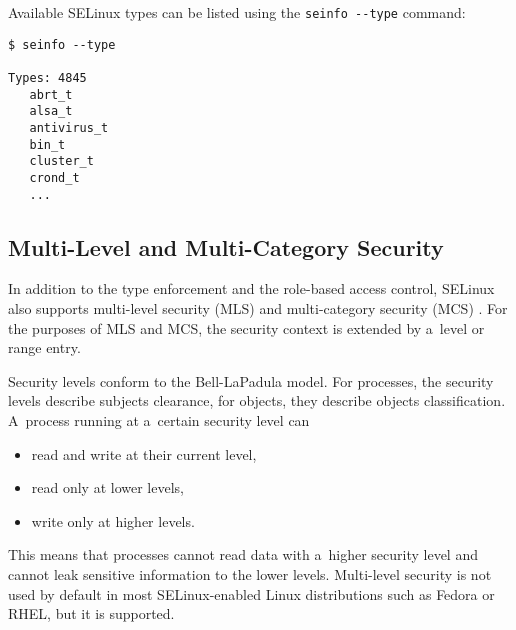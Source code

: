 \pagebreak

Available SELinux types can be listed using the \texttt{seinfo -{}-type}
command:
\begin{lstlisting}
$ seinfo --type

Types: 4845
   abrt_t
   alsa_t
   antivirus_t
   bin_t
   cluster_t
   crond_t
   ...
\end{lstlisting}

\subsection{Multi-Level and Multi-Category Security}
\label{mls}
In addition to the type enforcement and the role-based access control, SELinux
also supports multi-level security (MLS) and multi-category security (MCS)
\cite[pp.~48--53]{tsn}. For the purposes of MLS and MCS, the security context is
extended by a~level or range entry.

Security levels conform to the Bell-LaPadula model. For processes, the security
levels describe subjects clearance, for objects, they describe objects
classification. A~process running at a~certain security level can
\begin{itemize}
    \item read and write at their current level,
    \item read only at lower levels,
    \item write only at higher levels.
\end{itemize}
This means that processes cannot read data with a~higher security level and
cannot leak sensitive information to the lower levels. Multi-level security is
not used by default in most SELinux-enabled Linux distributions such as Fedora
or RHEL, but it is supported.

